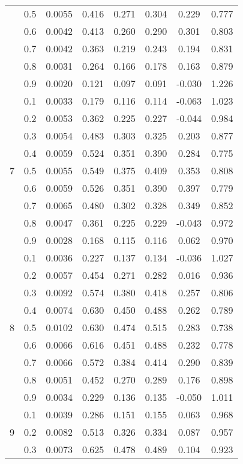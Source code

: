 \documentclass[11pt,a4paper]{report}
\begin{document}
\begin{longtable}{ | c | c || c | c | c | c | c | c | }
 & 0.5 & 0.0055 & 0.416 & 0.271 & 0.304 & 0.229 & 0.777 \\
 & 0.6 & 0.0042 & 0.413 & 0.260 & 0.290 & 0.301 & 0.803 \\
 & 0.7 & 0.0042 & 0.363 & 0.219 & 0.243 & 0.194 & 0.831 \\
 & 0.8 & 0.0031 & 0.264 & 0.166 & 0.178 & 0.163 & 0.879 \\
 & 0.9 & 0.0020 & 0.121 & 0.097 & 0.091 & -0.030 & 1.226 \\
 \hline
\multirow{9}{*}{7} & 0.1 & 0.0033 & 0.179 & 0.116 & 0.114 & -0.063 & 1.023 \\
 & 0.2 & 0.0053 & 0.362 & 0.225 & 0.227 & -0.044 & 0.984 \\
 & 0.3 & 0.0054 & 0.483 & 0.303 & 0.325 & 0.203 & 0.877 \\
 & 0.4 & 0.0059 & 0.524 & 0.351 & 0.390 & 0.284 & 0.775 \\
 & 0.5 & 0.0055 & 0.549 & 0.375 & 0.409 & 0.353 & 0.808 \\
 & 0.6 & 0.0059 & 0.526 & 0.351 & 0.390 & 0.397 & 0.779 \\
 & 0.7 & 0.0065 & 0.480 & 0.302 & 0.328 & 0.349 & 0.852 \\
 & 0.8 & 0.0047 & 0.361 & 0.225 & 0.229 & -0.043 & 0.972 \\
 & 0.9 & 0.0028 & 0.168 & 0.115 & 0.116 & 0.062 & 0.970 \\
 \hline
\multirow{9}{*}{8} & 0.1 & 0.0036 & 0.227 & 0.137 & 0.134 & -0.036 & 1.027 \\
 & 0.2 & 0.0057 & 0.454 & 0.271 & 0.282 & 0.016 & 0.936 \\
 & 0.3 & 0.0092 & 0.574 & 0.380 & 0.418 & 0.257 & 0.806 \\
 & 0.4 & 0.0074 & 0.630 & 0.450 & 0.488 & 0.262 & 0.789 \\
 & 0.5 & 0.0102 & 0.630 & 0.474 & 0.515 & 0.283 & 0.738 \\
 & 0.6 & 0.0066 & 0.616 & 0.451 & 0.488 & 0.232 & 0.778 \\
 & 0.7 & 0.0066 & 0.572 & 0.384 & 0.414 & 0.290 & 0.839 \\
 & 0.8 & 0.0051 & 0.452 & 0.270 & 0.289 & 0.176 & 0.898 \\
 & 0.9 & 0.0034 & 0.229 & 0.136 & 0.135 & -0.050 & 1.011 \\
 \hline
\multirow{9}{*}{9} & 0.1 & 0.0039 & 0.286 & 0.151 & 0.155 & 0.063 & 0.968 \\
 & 0.2 & 0.0082 & 0.513 & 0.326 & 0.334 & 0.087 & 0.957 \\
 & 0.3 & 0.0073 & 0.625 & 0.478 & 0.489 & 0.104 & 0.923 \\

\end{longtable}
\end{document}
